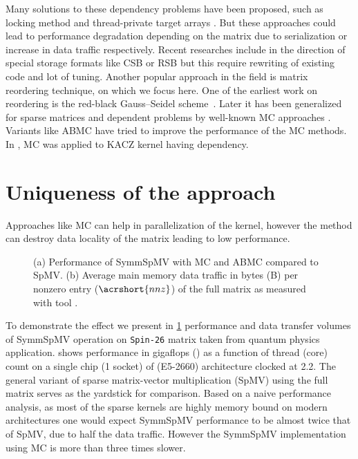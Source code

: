 Many solutions to these dependency problems have been proposed, such as 
locking method and thread-private target arrays \cite{sparseX,thread_private_symm_spmv}.
But these approaches could lead to performance degradation depending
on the matrix due to serialization or increase in data traffic respectively.
Recent researches include in the direction of special storage formats like
 CSB \cite{CSB} or RSB \cite{RSB} but this require rewriting of existing 
 code and lot of tuning. Another popular approach in the field is matrix 
reordering technique, on which we focus here.
One of the earliest work on reordering is the red-black 
Gauss--Seidel scheme~\cite{RBGS}. 
Later it has been generalized for sparse matrices and \DK dependent 
problems by well-known \acrfull{MC} approaches \cite{MC, COLPACK}. 
Variants like \acrfull{ABMC} \cite{ABMC} have tried to
improve the  performance of the \acrshort{MC} methods. In \cite{feast_mc},
\acrshort{MC} was applied to \acrshort{KACZ} kernel having  \DTWO dependency. 

\section{Uniqueness of the approach} \label{sec:uniqueness}
Approaches like \acrshort{MC} can help in parallelization of the kernel, however
the method can destroy data locality of the matrix leading to low performance.
\setlength{\belowcaptionskip}{-12pt}
\begin{figure}[tb]
	 \hspace{1em}
	\caption{\label{fig:motivation}(a) Performance of \acrshort{SymmSpMV} with 
		\acrshort{MC} and \acrshort{ABMC} compared to \acrshort{SpMV}. 
		(b) Average main memory data traffic in bytes (B) per nonzero entry ($\acrshort{nnz}$) 
		of the full matrix as measured with \LIKWID tool \cite{LIKWID}.}
\end{figure}
To demonstrate the effect we present in \cref{fig:motivation} performance and 
data transfer volumes of  \acrshort{SymmSpMV} operation on \texttt{Spin-26} matrix 
taken from quantum physics application. 
shows performance in gigaflops (\GF) as a function of thread (core) count 
on a single chip (1 socket) of \Intel \IVB (E5-2660) architecture 
clocked at 2.2\GHZ.
The general variant  of sparse matrix-vector multiplication (\acrshort{SpMV})
 using the full matrix  serves as the yardstick for comparison. 
Based on a naive performance analysis, as most of the sparse
kernels are highly memory bound on modern architectures
one would expect \acrshort{SymmSpMV} performance 
to be almost twice that of \acrshort{SpMV}, due to half the data traffic. 
However the \acrshort{SymmSpMV} implementation using \acrshort{MC} is more
than three times slower.

